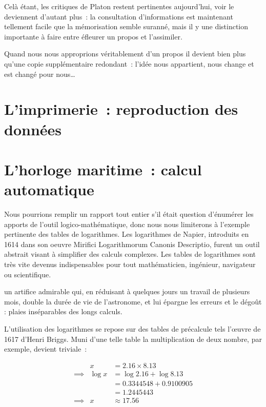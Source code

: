 Celà étant, les critiques de Platon restent pertinentes aujourd'hui, voir le deviennent d'autant plus~: la consultation d'informations est maintenant tellement facile que la mémorisation semble suranné, mais il y une distinction importante à faire entre éfleurer un propos et l'assimiler.

Quand nous nous approprions véritablement d'un propos il devient bien plus qu'une copie supplémentaire redondant~: l'idée nous appartient, nous change et est changé pour nous\ldots

\chapter{L'imprimerie~: reproduction des données}


\chapter{L'horloge maritime~: calcul automatique}
Nous pourrions remplir un rapport tout entier s'il était question d'énumérer les apports de l'outil logico-mathématique, donc nous nous limiterons à l'exemple pertinente des tables de logarithmes. Les logarithmes de Napier, introduits en 1614 dans son oeuvre \og{}Mirifici Logarithmorum Canonis Descriptio\fg{}, furent un outil abstrait visant à simplifier des calculs complexes. Les tables de logarithmes sont très vite devenus indispensables pour tout mathématicien, ingénieur, navigateur ou scientifique.

\begin{coolquote} un artifice admirable qui, en réduisant à quelques jours un travail de plusieurs mois, double la durée de vie de l'astronome, et lui épargne les erreurs et le dégoût : plaies inséparables des longs calculs.
\end{coolquote}

L'utilisation des logarithmes se repose sur des tables de précalcule tels l'\oe{}uvre de 1617 d'Henri Briggs. Muni d'une telle table la multiplication de deux nombre, par exemple, devient triviale~:

\begin{eqnarray}
                    &x            &= 2.16\times{8.13}              \nonumber \\
        \implies{}  &\log{x}      &= \log{2.16}+\log{8.13}         \nonumber \\
                    &             &= 0.3344548 + 0.9100905         \nonumber \\
                    &             &= 1.2445443                     \nonumber \\
        \implies{}  &x            &\approx{17.56}                   \nonumber \\
\end{eqnarray}

